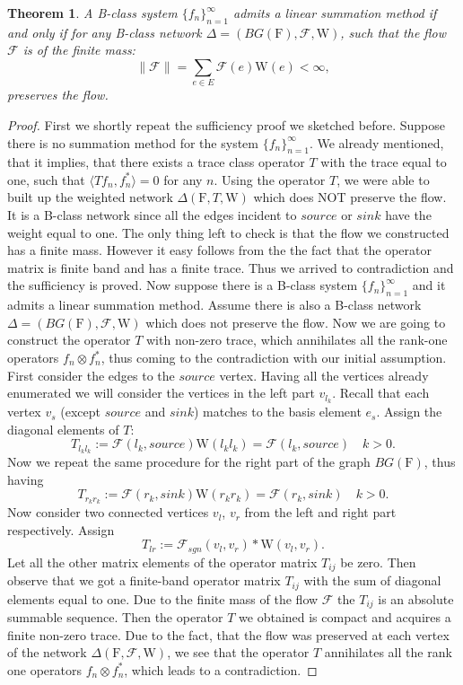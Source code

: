\documentclass[12pt]{article}
\newtheorem{theorem}{Theorem}
\theoremstyle{definition}
\newcommand{\seq}[1]{\{{#1}_n\}_{n=1}^\infty}
\newcommand{\fsys}{\mathrm{F}}
\newcommand{\wt}{\mathrm{W}}
\newcommand{\flow}{\mathcal{F}}
\newcommand{\flowsgn}{\mathcal{F}_{sgn}}
\newcommand{\source}{\mathit{source}}
\newcommand{\sink}{\mathit{sink}}
\newcommand{\scal}[2]{\langle {#1}, {#2} \rangle}
\newcommand{\net}{\Delta}
\numberwithin{remark}{section}
\numberwithin{theorem}{section}
\numberwithin{prop}{section}
\numberwithin{equation}{section}
\numberwithin{lemma}{section}
\numberwithin{prop_under_lemma}{lemma}
\begin{document}
    \begin{theorem}
      \label{thm-graph-eq}
        A B-class system $\seq{f}$ admits a linear summation method if and only if for any 
        B-class network $\net = (BG(\fsys), \flow, \wt)$, such that the flow $\flow$ is of the finite mass:
        $$
          \|\flow\| = \sum_{e \in E} \flow(e) \wt(e) < \infty,
        $$
        preserves the flow.
    \end{theorem}
    \begin{proof}
      First we shortly repeat the sufficiency proof we sketched before.
      Suppose there is no summation method for the system $\seq{f}$.
      We already mentioned, that it implies, that there exists a trace class operator $T$ with
      the trace equal to one, such that $\scal{Tf_n}{f_n^*} = 0$ for any $n$.
      Using the operator $T$, we were able to built up the weighted network
      $\net(\fsys, T, \wt)$ which does NOT preserve the flow. 
      It is a B-class network since all the edges incident to $\source$ or $\sink$ have the weight
      equal to one.
      The only thing left to check is that the flow we constructed has a finite mass.
      However it easy follows from the the fact that the operator matrix is finite band and has a finite trace.
      Thus we arrived to contradiction and the sufficiency is proved.
      Now suppose there is a B-class system $\seq{f}$ and it admits a linear summation method.
      Assume there is also a B-class network $\net = (BG(\fsys), \flow, \wt)$ which does not preserve the flow.
      Now we are going to construct the operator $T$ with non-zero trace, which annihilates all the rank-one
      operators $f_n \otimes f^*_n$, thus coming to the contradiction with our initial assumption.
      First consider the edges to the $\source$ vertex. Having all the vertices already enumerated
      we will consider the vertices in the left part $v_{l_k}$.
      Recall that each vertex $v_s$ (except $\source$ and $\sink$) matches to the basis element $e_s$.
      Assign the diagonal elements of $T$:
      $$
        T_{l_k l_k} := \flow(l_k, \source) \wt(l_k l_k) = \flow(l_k, \source) \quad k > 0.
      $$
      Now we repeat the same procedure for the right part of the graph $BG(\fsys)$, thus having
      $$
        T_{r_k r_k} := \flow(r_k, \sink) \wt(r_k r_k) = \flow(r_k, \sink) \quad k > 0.
      $$
      Now consider two connected vertices $v_l$, $v_r$ from the left and right part
      respectively. Assign
      $$
        T_{lr} := \flowsgn(v_l, v_r) * \wt(v_l, v_r).
      $$
      Let all the other matrix elements of the operator matrix $T_{ij}$ be zero.
      Then observe that we got a finite-band operator matrix $T_{ij}$ with the sum of diagonal elements
      equal to one.
      Due to the finite mass of the flow $\flow$ the $T_{ij}$ is an absolute summable sequence.
      Then the operator $T$ we obtained is compact and acquires a finite non-zero trace.
      Due to the fact, that the flow was preserved at each vertex of the network $\net(\fsys, \flow, \wt)$,
      we see that the operator $T$ annihilates all the rank one operators $f_n \otimes f^*_n$,
      which leads to a contradiction.
    \end{proof}
    
\end{document}
